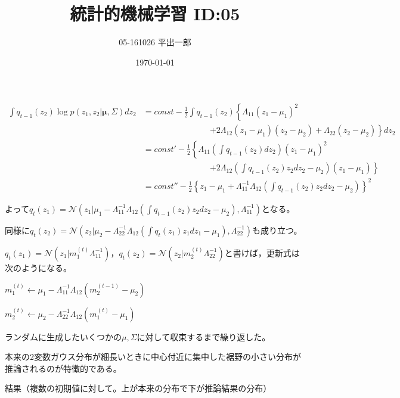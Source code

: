 \documentclass[a4j]{jarticle}
\title{統計的機械学習 ID:05}
\author{05-161026 平出一郎}
\date{\today}
\begin{document}
\thispagestyle{empty}
\maketitle
\pagebreak

\begin{align*}
\int q_{t-1}(z_2)\log p( z_1,z_2 | \bm{\mu},\Sigma) dz_2 &= const - \frac{1}{2}\int q_{t-1}(z_2)\left\{ \Lambda_{11}(z_1-\mu_1)^2 \right. \\
&\quad\quad\quad\quad\quad\quad\quad\quad \left. + 2\Lambda_{12}(z_1-\mu_1)(z_2-\mu_2) +\Lambda_{22}(z_2-\mu_2) \right\} dz_2 \\
&=const' - \frac{1}{2} \left\{ \Lambda_{11}\left(\int q_{t-1}(z_2)dz_2\right)(z_1-\mu_1)^2\right.\\
&\quad\quad\quad\quad\quad\quad\quad\quad \left.+2\Lambda_{12}\left(\int q_{t-1}(z_2)z_2dz_2 - \mu_2 \right)(z_1-\mu_1) \right\} \\
&=const'' - \frac{1}{2}\left\{ z_1-\mu_1+\Lambda_{11}^{-1}\Lambda_{12} \left( \int q_{t-1}(z_2)z_2dz_2 - \mu_2  \right) \right\}^2
\end{align*}


よって$q_t(z_1) = \mathcal{N} ( z_1 | \mu_1- \Lambda_{11}^{-1}\Lambda_{12} ( \int q_{t-1}(z_2)z_2dz_2 - \mu_2) ,\Lambda_{11}^{-1} ) $となる。


同様に$q_t(z_2) = \mathcal{N} ( z_2 | \mu_2- \Lambda_{22}^{-1}\Lambda_{12} ( \int q_{t}(z_1)z_1dz_1 - \mu_1 ) ,\Lambda_{22}^{-1}  )$も成り立つ。

$q_t(z_1) = \mathcal{N}(z_1 |  m^{(t)}_1 \Lambda_{11}^{-1} )$，$q_t(z_2) = \mathcal{N}(z_2 |  m^{(t)}_2 \Lambda_{22}^{-1} )$と書けば，更新式は次のようになる。

$m^{(t)}_1 \leftarrow \mu_1-\Lambda_{11}^{-1}\Lambda_{12} ( m_2^{(t-1)} - \mu_2)$


$m^{(t)}_2 \leftarrow \mu_2-\Lambda_{22}^{-1}\Lambda_{12} ( m_1^{(t)} - \mu_1)$



ランダムに生成したいくつかの$\mu,\Sigma$に対して収束するまで繰り返した。

本来の2変数ガウス分布が細長いときに中心付近に集中した裾野の小さい分布が推論されるのが特徴的である。

結果（複数の初期値に対して。上が本来の分布で下が推論結果の分布）
\end{document}
